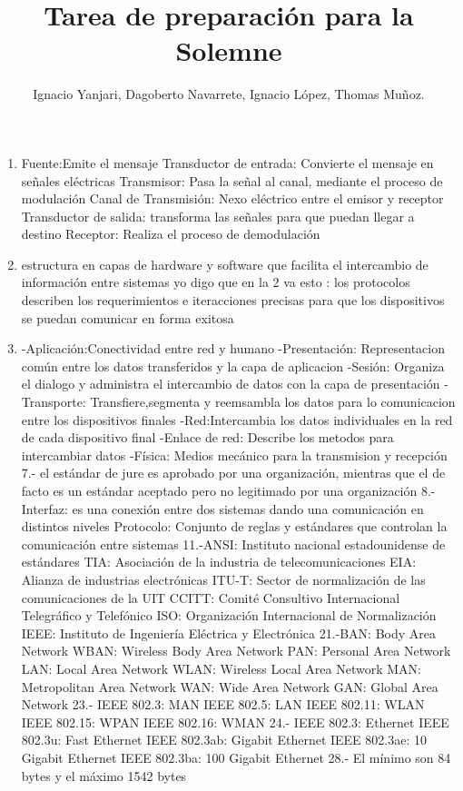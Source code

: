 \documentclass{udparticle}
\title{Tarea de preparación para la Solemne}
\author{Ignacio Yanjari, Dagoberto Navarrete, Ignacio López, Thomas Muñoz.}
\begin{document}
\maketitle
\begin{enumerate}
\item Fuente:Emite el mensaje
Transductor de entrada: Convierte el mensaje en señales eléctricas
Transmisor: Pasa la señal al canal, mediante el proceso de modulación
Canal de Transmisión: Nexo eléctrico entre el emisor y receptor
Transductor de salida: transforma las señales para que puedan llegar a destino
Receptor: Realiza el proceso de demodulación 
\item estructura en capas de hardware y software que facilita el intercambio de información entre sistemas
yo digo que en la 2 va esto : los protocolos describen los requerimientos e iteracciones precisas para que los
dispositivos se puedan comunicar en forma exitosa
\item -Aplicación:Conectividad entre red y humano
    -Presentación: Representacion común entre los datos transferidos y la capa de aplicacion
    -Sesión: Organiza el dialogo y administra el intercambio de datos con la capa de presentación
    -Transporte: Transfiere,segmenta y reemsambla los datos para lo comunicacion entre los dispositivos finales
    -Red:Intercambia los datos individuales en la red de cada dispositivo final
    -Enlace de red: Describe los metodos para intercambiar datos
    -Física: Medios mecánico para la transmision y recepción
7.- el estándar de jure es aprobado por una organización, mientras que el de facto es un estándar aceptado pero no legitimado por una organización
8.-Interfaz: es una conexión entre dos sistemas dando una comunicación en distintos niveles
Protocolo: Conjunto de reglas y estándares que controlan la comunicación entre sistemas
11.-ANSI: Instituto nacional estadounidense de estándares
TIA: Asociación de la industria de telecomunicaciones
EIA: Alianza de industrias electrónicas
ITU-T: Sector de normalización de las comunicaciones de la UIT
CCITT: Comité Consultivo Internacional Telegráfico y Telefónico
ISO: Organización Internacional de Normalización
IEEE: Instituto de Ingeniería Eléctrica y Electrónica
21.-BAN: Body Area Network
WBAN: Wireless Body Area Network
PAN: Personal Area Network
LAN: Local Area Network
WLAN: Wireless Local Area Network
MAN: Metropolitan Area Network
WAN: Wide Area Network
GAN: Global Area Network
23.- IEEE 802.3: MAN
IEEE 802.5: LAN
IEEE 802.11: WLAN
IEEE 802.15: WPAN
IEEE 802.16: WMAN
24.- IEEE 802.3: Ethernet
IEEE   802.3u: Fast Ethernet
IEEE  802.3ab: Gigabit Ethernet
IEEE 802.3ae: 10 Gigabit Ethernet
IEEE 802.3ba: 100 Gigabit Ethernet
28.- El mínimo son 84 bytes y el máximo 1542 bytes

\end{enumerate}
\end{document}
